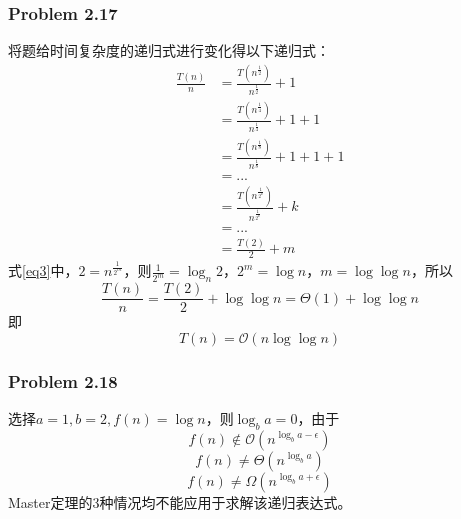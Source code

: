 \documentclass[UTF8,12pt]{article} %
\makeatletter
\theoremstyle{definition}
\newenvironment{proof}[1][\protect\proofname]{\par
\normalfont\topsep6\p@\@plus6\p@\relax
\trivlist
\itemindent\parindent
\item[\hskip\labelsep
\scshape
#1]\ignorespaces
}{%
\endtrivlist\@endpefalse
}
\renewcommand{\proofname}{\it{\textbf{证明}}}
\makeatother
\begin{document}
\subsubsection*{Problem 2.17}
\begin{proof}[\textbf{解答}]
将题给时间复杂度的递归式进行变化得以下递归式：
\begin{equation}
 \label{eq3}
\begin{split}
	\frac{T(n)}{n}&=\frac{T(n^{\frac{1}{2}})}{n^{\frac{1}{2}}}+1  \\
				&= \frac{T(n^{\frac{1}{4}})}{n^{\frac{1}{4}}}+1 +1\\ 
				&=\frac{T(n^{\frac{1}{8}})}{n^{\frac{1}{8}}}+1 +1+1\\
				&= ...\\
				&=\frac{T(n^{\frac{1}{2^{k}}})}{n^{\frac{1}{2^{k}}}}+k\\
				&=...\\
				&= \frac{T(2)}{2}+ m 
\end{split}
\end{equation}
式\ref{eq3}中，$2=n^{\frac{1}{2^{m}}}$，则$\frac{1}{2^{m}} = \log_{n} 2 $，$2^{m} = \log n$，$m = \log \log n$，所以\[\frac{T(n)}{n} = \frac{T(2)}{2} + \log \log n = \Theta(1) + \log\log n\]即\[T(n) = \mathcal{O}(n \log\log n)\]

\end{proof}


\subsubsection*{Problem 2.18}
\begin{proof}[\textbf{解答}]
选择$a=1,b=2,f(n)=\log n$，则$\log_{b} a = 0$，由于\[f(n) \notin \mathcal{O}(n^{\log_{b}a - \epsilon})\]\[f(n)\ne \Theta(n^{\log_{b}a})\]\[f(n)\ne \Omega(n^{\log_{b}a + \epsilon})\]Master定理的3种情况均不能应用于求解该递归表达式。
\end{proof}
\end{document}
